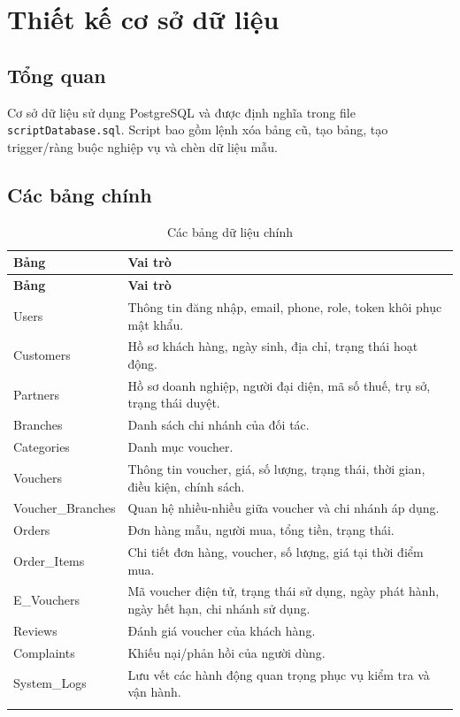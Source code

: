 \section{Thiết kế cơ sở dữ liệu}

\subsection{Tổng quan}

Cơ sở dữ liệu sử dụng PostgreSQL và được định nghĩa trong file \texttt{scriptDatabase.sql}. Script bao gồm lệnh xóa bảng cũ, tạo bảng, tạo trigger/ràng buộc nghiệp vụ và chèn dữ liệu mẫu.

\subsection{Các bảng chính}

\begin{longtable}{|p{3.4cm}|p{9.8cm}|}
\hline
\textbf{Bảng} & \textbf{Vai trò} \\ \hline
\endfirsthead
\hline
\textbf{Bảng} & \textbf{Vai trò} \\ \hline
\endhead
Users & Thông tin đăng nhập, email, phone, role, token khôi phục mật khẩu. \\ \hline
Customers & Hồ sơ khách hàng, ngày sinh, địa chỉ, trạng thái hoạt động. \\ \hline
Partners & Hồ sơ doanh nghiệp, người đại diện, mã số thuế, trụ sở, trạng thái duyệt. \\ \hline
Branches & Danh sách chi nhánh của đối tác. \\ \hline
Categories & Danh mục voucher. \\ \hline
Vouchers & Thông tin voucher, giá, số lượng, trạng thái, thời gian, điều kiện, chính sách. \\ \hline
Voucher\_Branches & Quan hệ nhiều-nhiều giữa voucher và chi nhánh áp dụng. \\ \hline
Orders & Đơn hàng mẫu, người mua, tổng tiền, trạng thái. \\ \hline
Order\_Items & Chi tiết đơn hàng, voucher, số lượng, giá tại thời điểm mua. \\ \hline
E\_Vouchers & Mã voucher điện tử, trạng thái sử dụng, ngày phát hành, ngày hết hạn, chi nhánh sử dụng. \\ \hline
Reviews & Đánh giá voucher của khách hàng. \\ \hline
Complaints & Khiếu nại/phản hồi của người dùng. \\ \hline
System\_Logs & Lưu vết các hành động quan trọng phục vụ kiểm tra và vận hành. \\ \hline
\caption[]{Các bảng dữ liệu chính}\\
\end{longtable}

